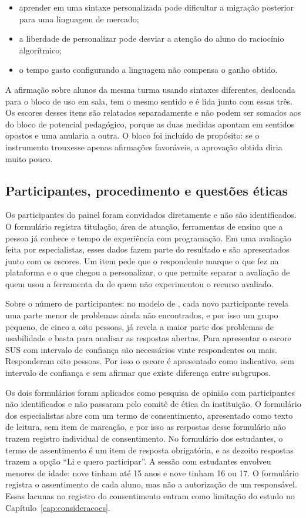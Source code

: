 \begin{itemize}
    \item aprender em uma sintaxe personalizada pode dificultar a migração posterior para uma linguagem de mercado;
    \item a liberdade de personalizar pode desviar a atenção do aluno do raciocínio algorítmico;
    \item o tempo gasto configurando a linguagem não compensa o ganho obtido.
\end{itemize}
 A afirmação sobre alunos da mesma turma usando sintaxes diferentes, deslocada para o bloco de uso em sala, tem o mesmo sentido e é lida junto com essas três. Os escores desses itens são relatados separadamente e não podem ser somados aos do bloco de potencial pedagógico, porque as duas medidas apontam em sentidos opostos e uma anularia a outra. O bloco foi incluído de propósito: se o instrumento trouxesse apenas afirmações favoráveis, a aprovação obtida diria muito pouco.

\subsection{Participantes, procedimento e questões éticas}

Os participantes do painel foram convidados diretamente e não são identificados. O formulário registra titulação, área de atuação, ferramentas de ensino que a pessoa já conhece e tempo de experiência com programação. Em uma avaliação feita por especialistas, esses dados fazem parte do resultado e são apresentados junto com os escores. Um item pede que o respondente marque o que fez na plataforma e o que chegou a personalizar, o que permite separar a avaliação de quem usou a ferramenta da de quem não experimentou o recurso avaliado.

Sobre o número de participantes: no modelo de , cada novo participante revela uma parte menor de problemas ainda não encontrados, e por isso um grupo pequeno, de cinco a oito pessoas, já revela a maior parte dos problemas de usabilidade e basta para analisar as respostas abertas. Para apresentar o escore SUS com intervalo de confiança são necessários vinte respondentes ou mais. Responderam oito pessoas. Por isso o escore é apresentado como indicativo, sem intervalo de confiança e sem afirmar que existe diferença entre subgrupos.

Os dois formulários foram aplicados como pesquisa de opinião com participantes não identificados e não passaram pelo comitê de ética da instituição. O formulário dos especialistas abre com um termo de consentimento, apresentado como texto de leitura, sem item de marcação, e por isso as respostas desse formulário não trazem registro individual de consentimento. No formulário dos estudantes, o termo de assentimento é um item de resposta obrigatória, e as dezoito respostas trazem a opção ``Li e quero participar''. A sessão com estudantes envolveu menores de idade: nove tinham até 15 anos e nove tinham 16 ou 17. O formulário registra o assentimento de cada aluno, mas não a autorização de um responsável. Essas lacunas no registro do consentimento entram como limitação do estudo no Capítulo~\ref{cap:consideracoes}.

